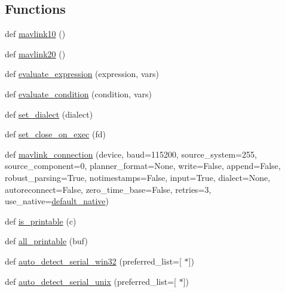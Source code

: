 \subsection*{Functions}
\begin{DoxyCompactItemize}
\item 
def \mbox{\hyperlink{namespacepymavlink_1_1mavutil_a7fd32207af170dbaf42dbd56905e6f38}{mavlink10}} ()
\item 
def \mbox{\hyperlink{namespacepymavlink_1_1mavutil_add838268f6c1da5cbdf2690e6f89c00d}{mavlink20}} ()
\item 
def \mbox{\hyperlink{namespacepymavlink_1_1mavutil_a59db6edd846450994bc53aabfeafff08}{evaluate\+\_\+expression}} (expression, vars)
\item 
def \mbox{\hyperlink{namespacepymavlink_1_1mavutil_a850b6d86829b1c79a5d58a74e8e2c3a0}{evaluate\+\_\+condition}} (condition, vars)
\item 
def \mbox{\hyperlink{namespacepymavlink_1_1mavutil_a00783411dfe2e390ef6fe4427a7a1b76}{set\+\_\+dialect}} (dialect)
\item 
def \mbox{\hyperlink{namespacepymavlink_1_1mavutil_ac57a06b1fcc6d1aebdf19e127291fedd}{set\+\_\+close\+\_\+on\+\_\+exec}} (fd)
\item 
def \mbox{\hyperlink{namespacepymavlink_1_1mavutil_aa6c4b8861f86ef3bb746fa0fab241c93}{mavlink\+\_\+connection}} (device, baud=115200, source\+\_\+system=255, source\+\_\+component=0, planner\+\_\+format=None, write=False, append=False, robust\+\_\+parsing=True, notimestamps=False, input=True, dialect=None, autoreconnect=False, zero\+\_\+time\+\_\+base=False, retries=3, use\+\_\+native=\mbox{\hyperlink{namespacepymavlink_1_1mavutil_a21ce9da7b698a7bc21c44b9f77341b62}{default\+\_\+native}})
\item 
def \mbox{\hyperlink{namespacepymavlink_1_1mavutil_ae8d15d242baf89755d968c50f6f300b1}{is\+\_\+printable}} (c)
\item 
def \mbox{\hyperlink{namespacepymavlink_1_1mavutil_ad8151d7419cca7f25a52185b8844c09e}{all\+\_\+printable}} (buf)
\item 
def \mbox{\hyperlink{namespacepymavlink_1_1mavutil_a7fcffc8f8165b00fa7fb9c81886e66d9}{auto\+\_\+detect\+\_\+serial\+\_\+win32}} (preferred\+\_\+list=\mbox{[}\textquotesingle{} $\ast$\textquotesingle{}\mbox{]})
\item 
def \mbox{\hyperlink{namespacepymavlink_1_1mavutil_a25cdb766d4635c7ca2e491614b6d87c7}{auto\+\_\+detect\+\_\+serial\+\_\+unix}} (preferred\+\_\+list=\mbox{[}\textquotesingle{} $\ast$\textquotesingle{}\mbox{]})

\end{DoxyCompactItemize}

